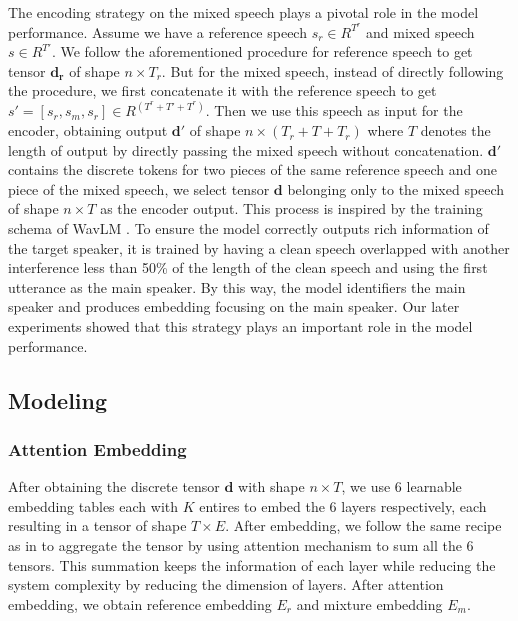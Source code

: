 \documentclass[conference]{IEEEtran}
\begin{document}
The encoding strategy on the mixed speech plays a pivotal role in the model performance. Assume we 
have a reference speech \(s_r \in R^{T^r} \) and mixed speech \(s \in R^{T'}\). 
We follow the 
aforementioned procedure for 
reference speech to get tensor \(\bm{d_r}\) of shape \(n \times T_r\). But for the mixed 
speech, instead of directly following the procedure, we first concatenate it with 
the reference speech to get \(s' = [s_r, s_m, s_r] \in R^{(T^r+T'+T^r)}\). Then we use this speech 
as input for the encoder, obtaining output \(\bm{d'}\) of shape \(n \times (T_r+T+T_r)\) where \(T\) 
denotes the length of output by directly passing the mixed speech without concatenation. \(\bm{d'}\) 
contains the discrete tokens for two pieces of the same reference speech and one piece of the mixed 
speech, we select tensor \(\bm{d}\) belonging only to the mixed speech of shape \(n\times T\) as the 
encoder output. This process is inspired by the training schema of WavLM \cite{wavlm}. To ensure the 
model correctly outputs rich information of the target speaker, it is trained by 
having a clean speech overlapped with another interference less than 50\% of the length of the clean 
speech and using the first utterance as the main speaker. By this way, the model identifiers the 
main speaker and produces embedding focusing on the main speaker. Our later experiments showed that 
this strategy plays an important role in the model performance. 



\subsection{Modeling}
\subsubsection{Attention Embedding}
After obtaining the discrete tensor \(\bm{d}\) with shape \(n\times T\), we use 6
learnable embedding tables each with \(K\) entires to embed the 6 layers 
respectively, each resulting in a tensor of shape \(T \times E\). 
After embedding, we follow the same recipe as in \cite{dasb} to 
aggregate the tensor by using attention mechanism to sum all the 6 tensors. This summation 
keeps the information of each layer while reducing the system complexity by reducing the 
dimension of layers. After attention embedding, we obtain reference embedding \(E_r\) and 
mixture embedding \(E_m\).
\end{document}
